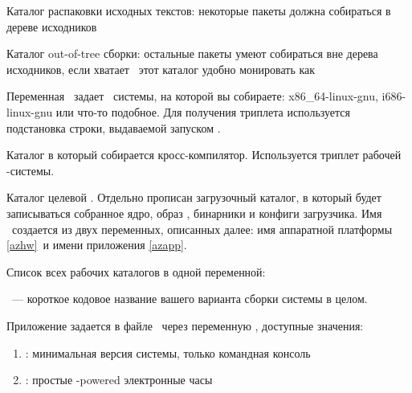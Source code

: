 Каталог распаковки исходных текстов: некоторые пакеты должна собираться в дереве
исходников


Каталог out-of-tree сборки: остальные пакеты умеют собираться вне дерева
исходников, если хватает \ram\ этот каталог удобно монировать как 


Переменная \ задает \ системы, на которой вы
собираете: x86\_64-linux-gnu, i686-linux-gnu или что-то подобное. Для получения
триплета используется подстановка строки, выдаваемой запуском .


Каталог в который собирается кросс-компилятор. Используется триплет
рабочей \linux-системы.


Каталог целевой . Отдельно прописан загрузочный каталог, в который
будет записываться собранное ядро, образ , бинарники и конфиги
загрузчика. Имя \ создается из двух переменных, описанных далее: имя
аппаратной платформы \ref{azhw}\ и имени приложения
\ref{azapp}.


Список всех рабочих каталогов в одной переменной:


 \label{azgz}


\label{azapp}

\ --- короткое кодовое название вашего варианта сборки системы
в целом.

Приложение задается в файле \ через
переменную , доступные значения:

\begin{enumerate}
  \item {}: минимальная версия системы, только командная консоль
  \item {}: простые \linux-powered электронные часы
\end{enumerate}

